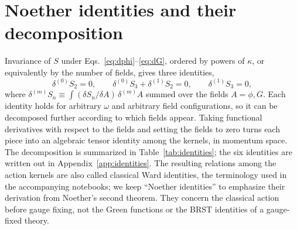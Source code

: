 \documentclass[prd,aps,preprint,superscriptaddress,nofootinbib,amsmath,amssymb,eqsecnum]{revtex4-2}
\begin{document}
\section{Noether identities and their decomposition}
\label{sec:identities}

Invariance of $S$ under Eqs.~\eqref{eq:dphi}--\eqref{eq:dG}, ordered by powers of
$\kappa$, or equivalently by the number of fields, gives three identities,
\begin{equation}
\delta^{(0)}S_2=0,\qquad
\delta^{(0)}S_3+\delta^{(1)}S_2=0,\qquad
\delta^{(1)}S_3=0,
\label{eq:noether}
\end{equation}
where $\delta^{(m)}S_n\equiv\int(\delta S_n/\delta A)\,\delta^{(m)}A$ summed over the
fields $A=\phi,G$. Each identity holds for arbitrary $\omega$ and arbitrary field
configurations, so it can be decomposed further according to which fields appear. Taking
functional derivatives with respect to the fields and setting the fields to zero turns each
piece into an algebraic tensor identity among the kernels, in momentum space. The
decomposition is summarized in Table~\ref{tab:identities}; the six identities are written out
in Appendix~\ref{app:identities}. The resulting relations among the action kernels are also
called classical Ward identities, the terminology used in the accompanying notebooks; we
keep ``Noether identities'' to emphasize their derivation from Noether's second theorem.
They concern the classical action before gauge fixing, not the Green functions or the BRST
identities of a gauge-fixed theory.
\end{document}
